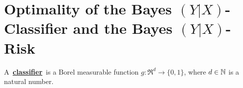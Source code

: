 

\section{Optimality of the Bayes $(Y \vert X)$-Classifier and the Bayes $(Y \vert X)$-Risk}
\setcounter{theorem}{0}
\setcounter{equation}{0}


\renewcommand{\theenumi}{\roman{enumi}}
\renewcommand{\labelenumi}{\textnormal{(\theenumi)}$\;\;$}


\begin{definition}[Classifier]
\mbox{}\vskip 0.1cm
\noindent
A \,\underline{\textbf{classifier}}\, is a Borel measurable function
$g : \Re^{d} \longrightarrow \{0,1\}$,
where $d \in \mathbb{N}$ is a natural number.
\end{definition}


